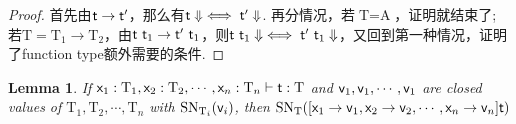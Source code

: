 \documentclass{article}
\theoremstyle{plain}
\newtheorem{lemma}[theorem]{Lemma}
\theoremstyle{nonumberplain}
\newtheorem{proof}{Proof}
\newcommand{\singletype}[1]{\text{#1}}
\newcommand{\termtype}[2]{\ensuremath{#1:#2}}
\newcommand{\term}[1]{\ensuremath\mathsf{#1}}
\begin{document}
\begin{proof}
首先由$\term{t} \to \term{t}'$，那么有$\term{t}\Downarrow \iff \term{t}'\Downarrow$. 再分情况，若$\singletype{T} = \singletype{A}$，证明就结束了; 若$\singletype{T} = \singletype{T}_1 \to \singletype{T}_2$，由$\term{t}~\term{t}_1 \to \term{t'}~\term{t}_1 $，则$\term{t}~\term{t}_1\Downarrow \iff \term{t}'~\term{t}_1\Downarrow$，又回到第一种情况，证明了function type额外需要的条件. 
\end{proof}

\begin{lemma}\label{logical predicate under substitution}
\rm If $\termtype{\term{x}_1}{\singletype{T}_1},\termtype{\term{x}_2}{\singletype{T}_2},\cdots,\termtype{\term{x}_n}{\singletype{T}_n} \vdash \termtype{\term{t}}{\singletype{T}}$ and $\term{v}_1,\term{v}_1,\cdots,\term{v}_1$ are closed values of $\singletype{T}_1,\singletype{T}_2,\cdots,\singletype{T}_n$ with $\text{SN}_{\singletype{T}_i}(\term{v}_i)$, then $\text{SN}_{\singletype{T}}([\term{x}_1 \to \term{v}_1,\term{x}_2 \to \term{v}_2,\cdots,\term{x}_n \to \term{v}_n]\term{t})$
\end{lemma}
\end{document}
